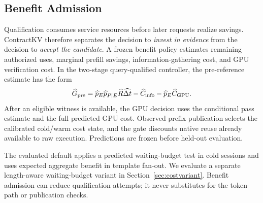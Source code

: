 \subsection{Benefit Admission}
\label{sec:benefit}
Qualification consumes service resources before later requests realize savings. ContractKV therefore separates the decision to \emph{invest in evidence} from the decision to \emph{accept the candidate}. A frozen benefit policy estimates remaining authorized uses, marginal prefill savings, information-gathering cost, and GPU verification cost. In the two-stage query-qualified controller, the pre-reference estimate has the form
\begin{equation}
 \widehat G_{\rm pre}=\widehat p_E\widehat p_{P\mid E}\widehat R\widehat{\Delta t}
 -\widehat C_{\rm info}-\widehat p_E\widehat C_{\rm GPU}.
\end{equation}
After an eligible witness is available, the GPU decision uses the conditional pass estimate and the full predicted GPU cost. Observed prefix publication selects the calibrated cold/warm cost state, and the gate discounts native reuse already available to raw execution. Predictions are frozen before held-out evaluation.

The evaluated default applies a predicted waiting-budget test in cold sessions and uses expected aggregate benefit in template fan-out. We evaluate a separate length-aware waiting-budget variant in Section~\ref{sec:costvariant}. Benefit admission can reduce qualification attempts; it never substitutes for the token-path or publication checks.
